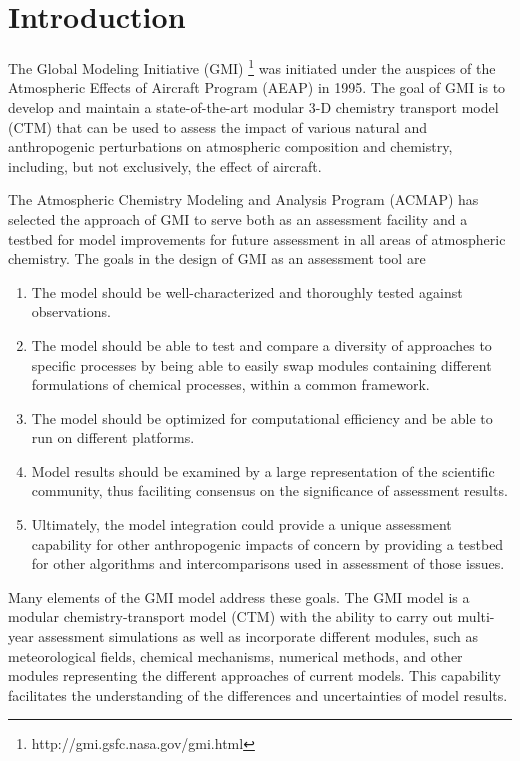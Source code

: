 
%
\chapter[Introduction]{Introduction} \label{chap:introduction}
%
The Global Modeling Initiative (GMI) 
\footnote{http://gmi.gsfc.nasa.gov/gmi.html}
was initiated under the auspices of the Atmospheric Effects of Aircraft 
Program (AEAP) in 1995. 
The goal of GMI is to develop and maintain a state-of-the-art
modular 3-D chemistry transport model (CTM) that can be used
to assess the impact of various natural and anthropogenic
perturbations on atmospheric composition and chemistry, including,
but not exclusively, the effect of aircraft.

The Atmospheric Chemistry Modeling and Analysis Program (ACMAP)
 has selected the approach of GMI to serve
both as an assessment facility and a testbed for model improvements
for future assessment in all areas of atmospheric chemistry.
%
The goals in the design of GMI as an assessment tool are \cite{Kinnison-etal01}
%
\begin{enumerate}
\item The model should be well-characterized and thoroughly tested
      against observations.
\item The model should be able to test and compare a diversity of
      approaches to specific processes by being able to easily swap
      modules containing different formulations of chemical
      processes, within a common framework.
\item The model should be optimized for computational efficiency and
      be able to run on different platforms.
\item Model results should be examined by a large representation of
      the scientific community, thus faciliting consensus on the significance
      of assessment results.
\item Ultimately, the model integration could provide a unique assessment
      capability for other anthropogenic impacts of concern by providing
      a testbed for other algorithms and intercomparisons used in
      assessment of those issues.
\end{enumerate}
%
Many elements of the GMI model address these goals.
The GMI model is a modular chemistry-transport model (CTM) with
the ability to carry out multi-year assessment simulations as
well as incorporate different modules, such as meteorological
fields, chemical mechanisms, numerical methods, and other modules
representing the different approaches of current models. This
capability facilitates the understanding of the differences
and uncertainties of model results.

